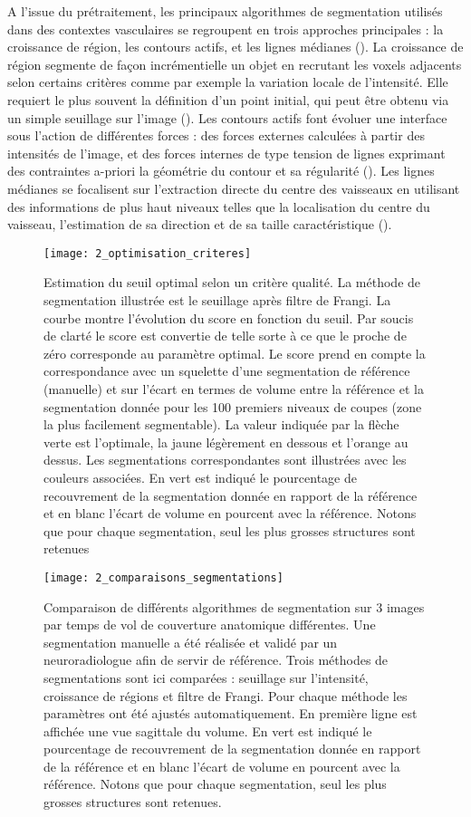 A l’issue du prétraitement, les principaux algorithmes de segmentation utilisés dans des contextes vasculaires se regroupent en trois approches principales : la croissance de région, les contours actifs, et les lignes médianes (\cite{Lesage2009}). La croissance de région segmente de façon incrémentielle un objet en recrutant les voxels adjacents selon certains critères comme par exemple la variation locale de l’intensité. Elle requiert le plus souvent la définition d’un point initial, qui peut être obtenu via un simple seuillage sur l’image (\cite{Boskamp2004}). Les contours actifs font évoluer une interface sous l’action de différentes forces : des forces externes calculées à partir des intensités de l’image, et des forces internes de type tension de lignes exprimant des contraintes a-priori la géométrie du contour et sa régularité (\cite{McInerney1996}). Les lignes médianes se focalisent sur l’extraction directe du centre des vaisseaux en utilisant des informations de plus haut niveaux telles que la localisation du centre du vaisseau, l’estimation de sa direction et de sa taille caractéristique (\cite{Aylward2002}). \\
\begin{figure}[!t]
\centering
\texttt{[image: 2\_optimisation\_criteres]}
\caption{Estimation du seuil optimal selon un critère qualité. La méthode de segmentation illustrée est le seuillage après filtre de Frangi. La courbe montre l'évolution du score en fonction du seuil. Par soucis de clarté le score est convertie de telle sorte à ce que le proche de zéro corresponde au paramètre optimal. Le score prend en compte la correspondance avec un squelette d'une segmentation de référence (manuelle) et sur l'écart en termes de volume entre la référence et la segmentation donnée pour les 100 premiers niveaux de coupes (zone la plus facilement segmentable). La valeur indiquée par la flèche verte est l'optimale, la jaune légèrement en dessous et l'orange au dessus. Les segmentations correspondantes sont illustrées avec les couleurs associées. En vert est indiqué le pourcentage de recouvrement de la segmentation donnée en rapport de la référence et en blanc l'écart de volume en pourcent avec la référence. Notons que pour chaque segmentation, seul les plus grosses structures sont retenues}
\label{fig:2_optimisation_criteres}	
\end{figure}
\begin{figure}[!t]
\centering
\texttt{[image: 2\_comparaisons\_segmentations]}
\caption{Comparaison de différents algorithmes de segmentation sur 3 images par temps de vol de couverture anatomique différentes. Une segmentation manuelle a été réalisée et validé par un neuroradiologue afin de servir de référence. Trois méthodes de segmentations sont ici comparées : seuillage sur l'intensité, croissance de régions et filtre de Frangi. Pour chaque méthode les paramètres ont été ajustés automatiquement. En première ligne est affichée une vue sagittale du volume. En vert est indiqué le pourcentage de recouvrement de la segmentation donnée en rapport de la référence et en blanc l'écart de volume en pourcent avec la référence. Notons que pour chaque segmentation, seul les plus grosses structures sont retenues.}
\label{fig:2_comparaisons_segmentations}	
\end{figure}
